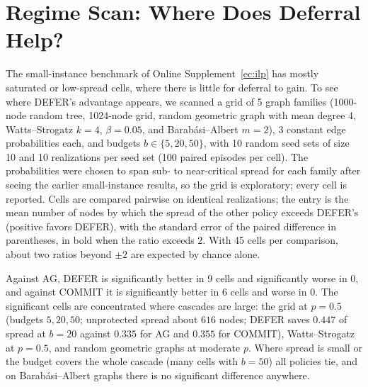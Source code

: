 \documentclass[ijoc,sglanonrev]{informs4}
\begin{document}
\section{Regime Scan: Where Does Deferral Help?}\label{ec:regime}

The small-instance benchmark of Online Supplement~\ref{ec:ilp} has mostly
saturated or low-spread cells, where there is little for deferral to gain. To
see where DEFER's advantage appears, we scanned a grid of 5 graph families
(1000-node random tree, 1024-node grid, random geometric graph with mean
degree 4, Watts--Strogatz $k=4$, $\beta=0.05$, and Barab\'asi--Albert $m=2$),
3 constant edge probabilities each, and budgets $b\in\{5,20,50\}$, with 10
random seed sets of size 10 and 10 realizations per seed set (100 paired
episodes per cell). The probabilities were chosen to span sub- to near-critical
spread for each family after seeing the earlier small-instance results, so the
grid is exploratory; every cell is reported. Cells are compared pairwise on
identical realizations; the entry is the mean number of nodes by which the
spread of the other policy exceeds DEFER's (positive favors DEFER), with the
standard error of the paired difference in parentheses, in bold when the ratio
exceeds $2$. With 45 cells per comparison, about two ratios beyond $\pm2$ are
expected by chance alone.

Against AG, DEFER is significantly better in 9 cells and significantly
worse in 0, and against COMMIT it is significantly better in 6 cells and worse in
0. The significant cells are concentrated where cascades are large:
the grid at $p=0.5$ (budgets $5,20,50$; unprotected spread about $616$ nodes;
DEFER saves $0.447$ of spread at $b=20$ against $0.335$ for AG and $0.355$ for
COMMIT), Watts--Strogatz at $p=0.5$, and random geometric graphs at moderate
$p$. Where spread is small or the budget covers the whole cascade (many cells
with $b=50$) all policies tie, and on Barab\'asi--Albert graphs there is no
significant difference anywhere.
\end{document}
